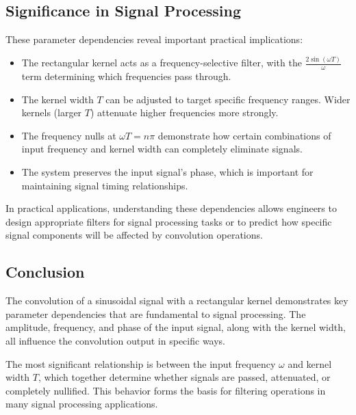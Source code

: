 \subsection{Significance in Signal Processing}
These parameter dependencies reveal important practical implications:

\begin{itemize}
    \item The rectangular kernel acts as a frequency-selective filter, with the $\frac{2\sin(\omega T)}{\omega}$ term determining which frequencies pass through.
    
    \item The kernel width $T$ can be adjusted to target specific frequency ranges. Wider kernels (larger $T$) attenuate higher frequencies more strongly.
    
    \item The frequency nulls at $\omega T = n\pi$ demonstrate how certain combinations of input frequency and kernel width can completely eliminate signals.
    
    \item The system preserves the input signal's phase, which is important for maintaining signal timing relationships.
\end{itemize}

In practical applications, understanding these dependencies allows engineers to design appropriate filters for signal processing tasks or to predict how specific signal components will be affected by convolution operations.

\subsection{Conclusion}
The convolution of a sinusoidal signal with a rectangular kernel demonstrates key parameter dependencies that are fundamental to signal processing. The amplitude, frequency, and phase of the input signal, along with the kernel width, all influence the convolution output in specific ways. 

The most significant relationship is between the input frequency $\omega$ and kernel width $T$, which together determine whether signals are passed, attenuated, or completely nullified. This behavior forms the basis for filtering operations in many signal processing applications.
